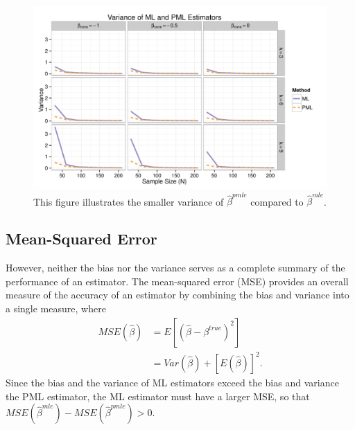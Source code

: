 \documentclass[12pt]{article}
\begin{document}
\begin{figure}[h]
\begin{center}
\includegraphics[width = \textwidth]{figs/sims-var.pdf}
\caption{This figure illustrates the smaller variance of $\hat{\beta}^{pmle}$ compared to $\hat{\beta}^{mle}$.}\label{fig:sims-var}
\end{center}
\end{figure}

\subsection*{Mean-Squared Error}

However, neither the bias nor the variance serves as a complete summary of the performance of an estimator.
The mean-squared error (MSE) provides an overall measure of the accuracy of an estimator by combining the bias and variance into a single measure, where
\begin{align}\label{eqn:mse}
MSE(\hat{\beta}) &= E[(\hat{\beta} - \beta^{true})^2] \nonumber\\
                            &= Var(\hat{\beta}) + [E(\hat{\beta})]^2 \text{.}
\end{align}
Since the bias and the variance of ML estimators exceed the bias and variance the PML estimator, the ML estimator must have a larger MSE, so that $MSE(\hat{\beta}^{mle}) - MSE(\hat{\beta}^{pmle}) > 0$.
\end{document}
